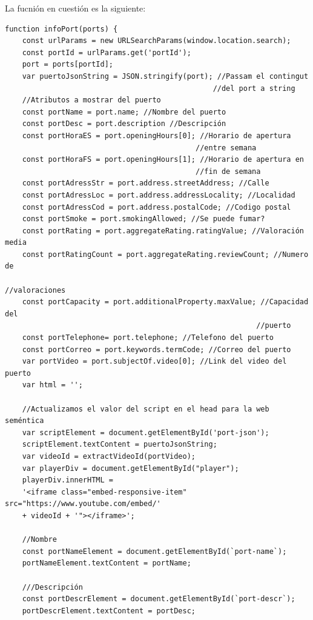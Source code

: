 \documentclass{article}
\begin{document}
\begin{itemize}
\begin{itemize}
    \end{itemize}
    La fucnión en cuestión es la siguiente:
    \begin{verbatim}
function infoPort(ports) {
    const urlParams = new URLSearchParams(window.location.search);
    const portId = urlParams.get('portId');
    port = ports[portId];
    var puertoJsonString = JSON.stringify(port); //Passam el contingut 
                                                //del port a string
    //Atributos a mostrar del puerto
    const portName = port.name; //Nombre del puerto
    const portDesc = port.description //Descripción
    const portHoraES = port.openingHours[0]; //Horario de apertura 
                                            //entre semana
    const portHoraFS = port.openingHours[1]; //Horario de apertura en 
                                            //fin de semana
    const portAdressStr = port.address.streetAddress; //Calle
    const portAdressLoc = port.address.addressLocality; //Localidad
    const portAdressCod = port.address.postalCode; //Codigo postal
    const portSmoke = port.smokingAllowed; //Se puede fumar?
    const portRating = port.aggregateRating.ratingValue; //Valoración media
    const portRatingCount = port.aggregateRating.reviewCount; //Numero de 
                                                              //valoraciones
    const portCapacity = port.additionalProperty.maxValue; //Capacidad del 
                                                          //puerto
    const portTelephone= port.telephone; //Telefono del puerto
    const portCorreo = port.keywords.termCode; //Correo del puerto
    var portVideo = port.subjectOf.video[0]; //Link del video del puerto
    var html = '';
    
    //Actualizamos el valor del script en el head para la web seméntica
    var scriptElement = document.getElementById('port-json');
    scriptElement.textContent = puertoJsonString;
    var videoId = extractVideoId(portVideo);
    var playerDiv = document.getElementById("player");
    playerDiv.innerHTML = 
    '<iframe class="embed-responsive-item" src="https://www.youtube.com/embed/'
    + videoId + '"></iframe>';

    //Nombre
    const portNameElement = document.getElementById(`port-name`);
    portNameElement.textContent = portName;

    ///Descripción
    const portDescrElement = document.getElementById(`port-descr`);
    portDescrElement.textContent = portDesc;


\end{verbatim}
\end{itemize}
\end{document}
